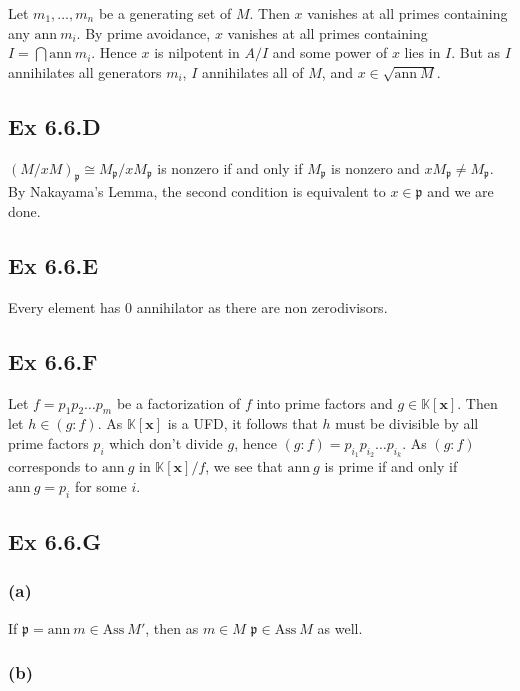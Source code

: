 \documentclass{article}
\theoremstyle{definition}
\newcommand{\K}{\mathbb{K}}
\newcommand{\Kx}{\K[\bm{x}]}
\newcommand{\ann}{\text{ann}}
\newcommand{\Ass}{\text{Ass}}
\begin{document}
Let $m_{1}, \ldots, m_n$ be a generating set of $M$. Then $x$ vanishes at all
primes containing any $\ann\ m_i$. By prime avoidance, $x$ vanishes at all primes
containing $I = \bigcap \ann\ m_i$. Hence $x$ is nilpotent in $A/I$ and some power
of $x$ lies in $I$. But as $I$ annihilates all generators $m_i$, $I$
annihilates all of $M$, and $x \in \sqrt{\ann\ M}$.

\subsection*{Ex 6.6.D}

$(M/xM)_{\mathfrak{p}} \cong M_{\mathfrak{p}}/xM_{\mathfrak{p}}$ is nonzero if
and only if $M_{\mathfrak{p}}$ is nonzero and $xM_\mathfrak{p} \not =
	M_{\mathfrak{p}}$. By Nakayama's Lemma, the second condition is equivalent to
$x \in \mathfrak{p}$ and we are done.

\subsection*{Ex 6.6.E}

Every element has $0$ annihilator as there are non zerodivisors.

\subsection*{Ex 6.6.F}

Let $f = p_{1}p_{2} \ldots p_m$ be a factorization of $f$ into prime factors
and $g \in \Kx$. Then let $h \in (g:f)$. As $\Kx$ is a UFD, it follows that $h$
must be divisible by all prime factors $p_i$ which don't divide $g$, hence
$(g:f) = p_{i_{1}}p_{i_{2}} \ldots p_{i_k}$. As $(g:f)$ corresponds to $\ann\
	g$ in $\Kx/f$, we see that $\ann\ g$ is prime if and only if $\ann\ g = p_i$
for some $i$.

\subsection*{Ex 6.6.G}


\subsubsection*{(a)}

If $\mathfrak{p} = \ann\ m \in \Ass\ M'$, then as $m \in M$ $\mathfrak{p} \in
	\Ass\ M$ as well.

\subsubsection*{(b)}
\end{document}
